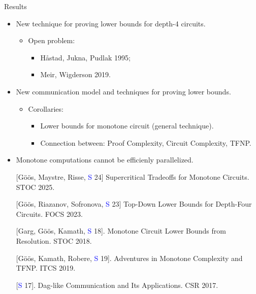 \begin{frame}{Results}

    \begin{itemize}   
        \item New technique for proving lower bounds for depth-4 circuits.
            \begin{itemize}
                \item Open problem:
                    \begin{itemize}
                        \item H{\aa}stad, Jukna, Pudlak 1995;
                        \item Meir, Wigderson 2019.
                    \end{itemize}
            \end{itemize}
        \pause
        \item New communication model and techniques for proving lower bounds.
            \begin{itemize}
                \item Corollaries:
                    \begin{itemize}
                        \item Lower bounds for monotone circuit (\alert{general technique}).
                        \item Connection between: Proof Complexity, Circuit Complexity, TFNP.
                    \end{itemize}
            \end{itemize}
            \pause
        \item Monotone computations cannot be efficienly parallelized.
    \end{itemize}


    \begin{enumerate}
        \item[] [G{\"{o}}{\"{o}}s, Maystre, Risse, \textcolor{blue}{S} 24] Supercritical Tradeoffs for
            Monotone Circuits. STOC 2025.
        \item[] [G{\"{o}}{\"{o}}s, Riazanov, Sofronova, \textcolor{blue}{S} 23] Top-Down Lower Bounds for
            Depth-Four Circuits. FOCS 2023.
        \item[] [Garg, G\"{o}\"{o}s, Kamath, \textcolor{blue}{S} 18]. Monotone Circuit Lower Bounds from
            Resolution. STOC 2018.
        \item[] [G\"{o}\"{o}s, Kamath, Robere, \textcolor{blue}{S} 19]. Adventures in Monotone Complexity and
            TFNP. ITCS 2019.
        \item[] [\textcolor{blue}{S} 17]. Dag-like Communication and Its Applications. CSR 2017.
    \end{enumerate}
    
\end{frame}



